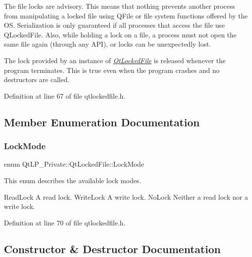The file locks are advisory. This means that nothing prevents another process from manipulating a locked file using Q\+File or file system functions offered by the OS. Serialization is only guaranteed if all processes that access the file use Q\+Locked\+File. Also, while holding a lock on a file, a process must not open the same file again (through any A\+PI), or locks can be unexpectedly lost.

The lock provided by an instance of {\itshape \hyperlink{class_qt_l_p___private_1_1_qt_locked_file}{Qt\+Locked\+File}} is released whenever the program terminates. This is true even when the program crashes and no destructors are called. 

Definition at line 67 of file qtlockedfile.\+h.



\subsection{Member Enumeration Documentation}
\mbox{\label{class_qt_l_p___private_1_1_qt_locked_file_ab9a54228983e33cf1fb8dace52141f26}} 
\subsubsection{\texorpdfstring{Lock\+Mode}{LockMode}}
{\footnotesize\ttfamily enum Qt\+L\+P\+\_\+\+Private\+::\+Qt\+Locked\+File\+::\+Lock\+Mode}

This enum describes the available lock modes.

Read\+Lock A read lock.  Write\+Lock A write lock.  No\+Lock Neither a read lock nor a write lock. 

Definition at line 70 of file qtlockedfile.\+h.



\subsection{Constructor \& Destructor Documentation}
\mbox{\label{class_qt_l_p___private_1_1_qt_locked_file_a69bf1d82b1ca46f97466634d8f9587aa}} 
